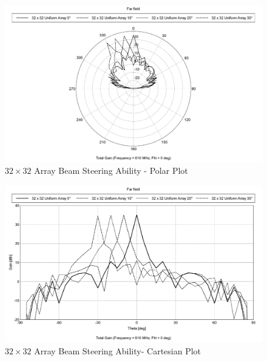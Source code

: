 \documentclass[11pt]{witseiepaper}
\begin{document}
\begin{bibunit}[witseie]
\begin{figure}[htb]
    \centering
    \includegraphics[width=\linewidth]{SteeringSmall-Polar.pdf}
    \caption{$32 \times 32$ Array Beam Steering Ability - Polar Plot}
    \label{fig:SteeringSmall-Polar}
\end{figure}

\begin{figure}[htb]
    \centering
    \includegraphics[width=\linewidth]{SteeringSmall-Cartesian.pdf}
    \caption{$32 \times 32$ Array Beam Steering Ability- Cartesian Plot}
        \label{fig:SteeringSmall-Cartesian}
\end{figure}




\end{bibunit}
\end{document}

